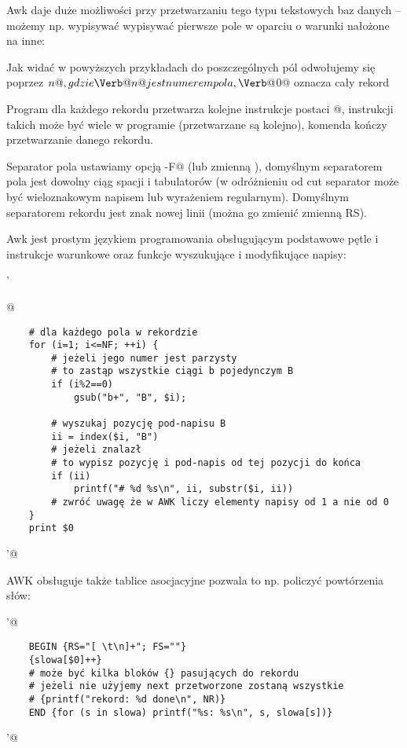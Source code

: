 \documentclass{pdfBooklets}
\begin{document}
Awk daje duże możliwości przy przetwarzaniu tego typu tekstowych baz danych -- możemy np.
wypisywać wypisywać pierwsze pole w oparciu o warunki nałożone na inne:

Jak widać w powyższych przykładach do poszczególnych pól odwołujemy się poprzez \Verb@$n@,
gdzie \Verb@n@ jest numerem pola, \Verb@$0@ oznacza cały rekord

Program dla każdego rekordu przetwarza kolejne instrukcje postaci @,
instrukcji takich może być wiele w programie (przetwarzane są kolejno),
komenda \Verb@next@ kończy przetwarzanie danego rekordu.

Separator pola ustawiamy opcją \Verb@-F@ (lub zmienną \Verb@FS@),
domyślnym separatorem pola jest dowolny ciąg spacji i tabulatorów
(w odróżnieniu od cut separator może być wieloznakowym napisem lub wyrażeniem regularnym).
Domyślnym separatorem rekordu jest znak nowej linii (można go zmienić zmienną RS).

Awk jest prostym językiem programowania obsługującym podstawowe pętle i instrukcje warunkowe
oraz funkcje wyszukujące i modyfikujące napisy:

\begin{oframed}\noindent{}\Verb@ '{@\vspace{-0.95em}
\begin{verbatim}
	# dla każdego pola w rekordzie
	for (i=1; i<=NF; ++i) {
		# jeżeli jego numer jest parzysty
		# to zastąp wszystkie ciągi b pojedynczym B
		if (i%2==0)
			gsub("b+", "B", $i);
		
		# wyszukaj pozycję pod-napisu B
		ii = index($i, "B")
		# jeżeli znalazł
		# to wypisz pozycję i pod-napis od tej pozycji do końca
		if (ii)
			printf("# %d %s\n", ii, substr($i, ii))
		# zwróć uwagę że w AWK liczy elementy napisy od 1 a nie od 0
	}
	print $0
\end{verbatim}
\vspace{-0.95em}\Verb@}'@\end{oframed}

\noindent
AWK obsługuje także tablice asocjacyjne pozwala to np. policzyć powtórzenia słów:

\begin{oframed}\noindent{}\Verb@ '@\vspace{-0.95em}
\begin{verbatim}
	BEGIN {RS="[ \t\n]+"; FS=""}
	{slowa[$0]++}
	# może być kilka bloków {} pasujących do rekordu
	# jeżeli nie użyjemy next przetworzone zostaną wszystkie
	# {printf("rekord: %d done\n", NR)}
	END {for (s in slowa) printf("%s: %s\n", s, slowa[s])}
\end{verbatim}
\vspace{-0.95em}\Verb@'@\end{oframed}
\end{document}
